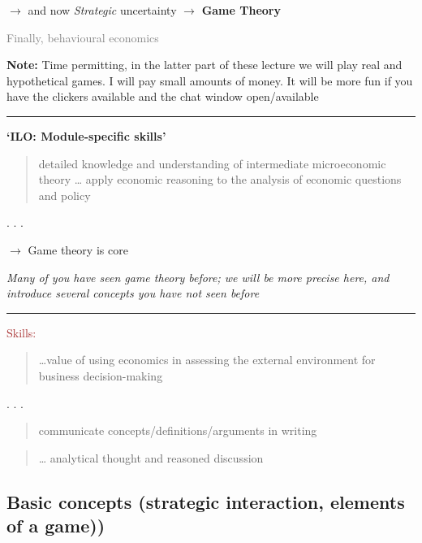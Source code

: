 \documentclass[]{article}
\begin{document}
\(\rightarrow\) and now \emph{Strategic} uncertainty \(\rightarrow\)
\textbf{Game Theory}

\textcolor{gray}{Finally, behavioural economics}

\textbf{Note:} Time permitting, in the latter part of these lecture we
will play real and hypothetical games. I will pay small amounts of
money. It will be more fun if you have the clickers available and the
chat window open/available

\begin{center}\rule{0.5\linewidth}{\linethickness}\end{center}

\textbf{`ILO: Module-specific skills'}

\begin{quote}
detailed knowledge and understanding of intermediate microeconomic
theory \ldots{} apply economic reasoning to the analysis of economic
questions and policy
\end{quote}

. . .

\(\rightarrow\) Game theory is core

\emph{Many of you have seen game theory before; we will be more precise
here, and introduce several concepts you have not seen before}

\begin{center}\rule{0.5\linewidth}{\linethickness}\end{center}

\textcolor{brown}{Skills:}

\bigskip

\begin{quote}
\ldots value of using economics in assessing the external environment
for business decision-making
\end{quote}

. . .

\begin{quote}
communicate concepts/definitions/arguments in writing
\end{quote}

\begin{quote}
\ldots{} analytical thought and reasoned discussion
\end{quote}

\hypertarget{basic-concepts-strategic-interaction-elements-of-a-game}{%
\subsection{Basic concepts (strategic interaction, elements of a
game))}\label{basic-concepts-strategic-interaction-elements-of-a-game}}
\end{document}
